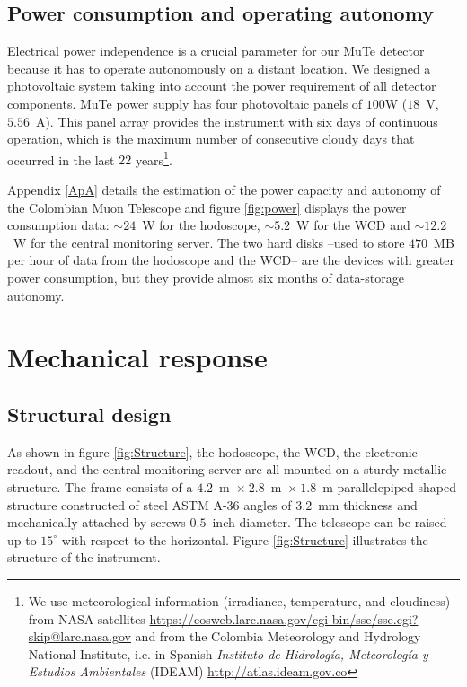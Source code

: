 \documentclass[letterpaper,11pt]{article}
\begin{document}
\subsection{Power consumption and operating autonomy}
Electrical power independence is a crucial parameter for our MuTe detector because it has to operate autonomously on a distant location. We designed a photovoltaic system taking into account the power requirement of all detector components. MuTe power supply has four photovoltaic panels of $100$W ($18$~V, $5.56$~A). This panel array provides the instrument with six days of continuous operation, which is the maximum number of consecutive cloudy days that occurred in the last $22$ years\footnote{We use meteorological information (irradiance, temperature, and cloudiness) from NASA satellites \url{https://eosweb.larc.nasa.gov/cgi-bin/sse/sse.cgi?skip@larc.nasa.gov} and from the Colombia Meteorology and Hydrology National Institute, i.e. in Spanish \textit{Instituto de Hidrología, Meteorología y Estudios Ambientales} (IDEAM) \url{http://atlas.ideam.gov.co}}. 

Appendix \ref{ApA} details the estimation of the power capacity and autonomy of the Colombian Muon Telescope and figure \ref{fig:power} displays the power consumption data: $\sim 24$~W for the hodoscope,  $\sim 5.2$~W for the WCD  and $\sim 12.2$~W for the central monitoring server. The two hard disks  --used to store $470$~MB per hour of data from the hodoscope and the WCD-- are the devices with greater power consumption, but they provide almost six months of data-storage autonomy.


\section{Mechanical response}
\label{mechanical}
\subsection{Structural design}
As shown in figure \ref{fig:Structure}, the hodoscope, the WCD, the electronic readout, and the central monitoring server are all mounted on a sturdy metallic structure. The frame consists of a $4.2$~m~$\times~2.8$~m~$\times~1.8$~m parallelepiped-shaped structure constructed of steel ASTM A-36 angles of $3.2$~mm thickness and mechanically attached by screws $0.5$~inch diameter. The telescope can be raised up to $15^{\circ}$ with respect to the horizontal. Figure \ref{fig:Structure} illustrates the structure of the instrument.
\end{document}
